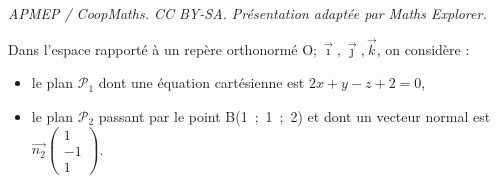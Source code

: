 \documentclass[10pt]{article}
\providecommand{\vect}[1]{\overrightarrow{#1}}
\providecommand{\Oijk}{\(\mathrm{O};\vec{\imath},\vec{\jmath},\vec{k}\)}
\begin{document}
\noindent\textit{APMEP / CoopMaths. CC BY-SA. Présentation adaptée par Maths Explorer.}\par\medskip
\medskip

Dans l'espace rapporté à un repère orthonormé \Oijk, on considère :

\begin{itemize}
\item[$\bullet~~$]le plan $\mathcal{P}_1$ dont une équation cartésienne est $2x + y - z +2 = 0$,
\item[$\bullet~~$]le plan $\mathcal{P}_2$ passant par le point B(1~;~1~;~2) et dont un vecteur normal est $\vect{n_2}\begin{pmatrix}1\\-1\\1\end{pmatrix}$.
\end{itemize}

\smallskip
\end{document}
